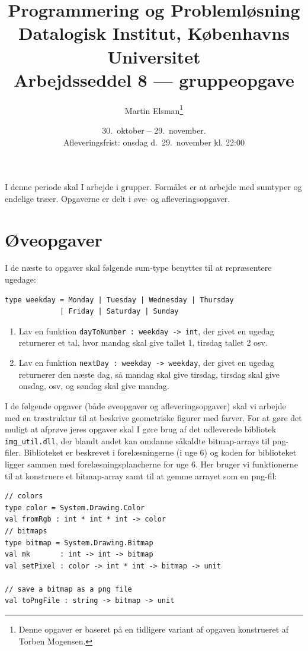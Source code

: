 \documentclass[a4paper,12pt]{article}
\title{Programmering og Problemløsning\\Datalogisk Institut,
  Københavns Universitet\\Arbejdsseddel 8 --- gruppeopgave}
\author{Martin Elsman\thanks{Denne opgaver er baseret på en tidligere variant af opgaven konstrueret af Torben Mogensen.}}
\date{30.\ oktober -- 29.\ november.\\Afleveringsfrist: onsdag d.\ 29.\ november kl. 22:00}
\begin{document}
\maketitle

I denne periode skal I arbejde i grupper.  Formålet er at arbejde med
sumtyper og endelige træer. Opgaverne er delt i øve- og
afleveringsopgaver.

\section*{Øveopgaver}

I de næste to opgaver skal følgende sum-type benyttes til at
repræsentere ugedage:

\begin{lstlisting}[numbers=none,frame=none,mathescape]
type weekday = Monday | Tuesday | Wednesday | Thursday
             | Friday | Saturday | Sunday
\end{lstlisting}

\begin{enumerate}[label=8ø.\arabic*,start=0]
\item Lav en funktion \texttt{dayToNumber : weekday -> int}, der givet
  en ugedag returnerer et tal, hvor mandag skal give tallet 1, tirsdag
  tallet 2 osv.

\item Lav en funktion \texttt{nextDay : weekday -> weekday}, der givet
  en ugedag returnerer den næste dag, så mandag skal give tirsdag,
  tirsdag skal give onsdag, osv, og søndag skal give mandag.
\end{enumerate}

I de følgende opgaver (både øveopgaver og
afleveringsopgaver) skal vi arbejde med en træstruktur til at beskrive geometriske
figurer med farver.  For at gøre det muligt at afprøve jeres opgaver
skal I gøre brug af det udleverede bibliotek \texttt{img\_util.dll}, der
blandt andet kan omdanne såkaldte bitmap-arrays til png-filer.  Biblioteket er
beskrevet i forelæsningerne (i uge 6) og koden for biblioteket ligger
sammen med forelæsningsplancherne for uge 6.  Her bruger vi
funktionerne til at konstruere et bitmap-array samt til at gemme
arrayet som en png-fil:

\begin{lstlisting}[numbers=none,frame=none,mathescape]
// colors
type color = System.Drawing.Color
val fromRgb : int * int * int -> color
// bitmaps
type bitmap = System.Drawing.Bitmap
val mk       : int -> int -> bitmap
val setPixel : color -> int * int -> bitmap -> unit

// save a bitmap as a png file
val toPngFile : string -> bitmap -> unit
\end{lstlisting}
\end{document}
